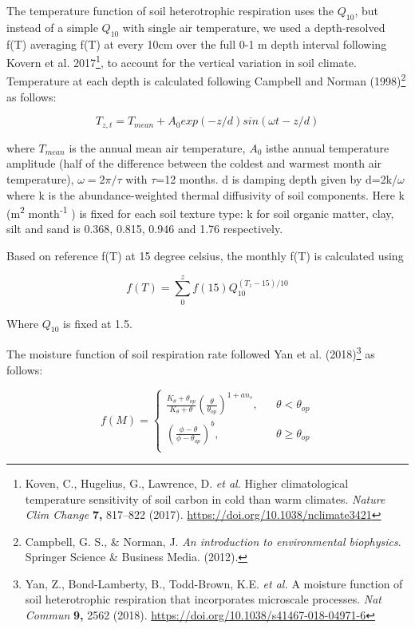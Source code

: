 \documentclass[
]{article}
\begin{document}
The temperature function of soil heterotrophic respiration uses the
\(Q_{10}\), but instead of a simple \(Q_{10}\) with single air
temperature, we used a depth-resolved f(T) averaging f(T) at every 10cm
over the full 0-1 m depth interval following Kovern et al.
2017\footnote{Koven, C., Hugelius, G., Lawrence, D. \emph{et al.} Higher
  climatological temperature sensitivity of soil carbon in cold than
  warm climates. \emph{Nature Clim Change} \textbf{7,} 817--822 (2017).
  \url{https://doi.org/10.1038/nclimate3421}}, to account for the
vertical variation in soil climate. Temperature at each depth is
calculated following Campbell and Norman (1998)\footnote{Campbell, G.
  S., \& Norman, J. \emph{An introduction to environmental biophysics}.
  Springer Science \& Business Media. (2012).} as follows:

\[T_{z,t} = T_{mean}+A_0exp(-z/d)sin(\omega t-z/d)\]

where \(T_{mean}\) is the annual mean air temperature, \(A_0\) isthe
annual temperature amplitude (half of the difference between the coldest
and warmest month air temperature), \(\omega=2 \pi / \tau\) with
\(\tau\)=12 months. d is damping depth given by d=2k/\(\omega\) where k
is the abundance-weighted thermal diffusivity of soil components. Here k
(m\textsuperscript{2} month\textsuperscript{-1} ) is fixed for each soil
texture type: k for soil organic matter, clay, silt and sand is 0.368,
0.815, 0.946 and 1.76 respectively.

Based on reference f(T) at 15 degree celsius, the monthly f(T) is
calculated using

\[f(T) = \sum_0^{z}f(15)Q_{10}^{(T_{z}-15)/10}\]

Where \(Q_{10}\) is fixed at 1.5.

The moisture function of soil respiration rate followed Yan et al.
(2018)\footnote{Yan, Z., Bond-Lamberty, B., Todd-Brown, K.E. \emph{et
  al.} A moisture function of soil heterotrophic respiration that
  incorporates microscale processes. \emph{Nat Commun} \textbf{9,} 2562
  (2018). \url{https://doi.org/10.1038/s41467-018-04971-6}} as follows:

\[f(M) = \left\{
\begin{array}{lcl}
\frac{K_\theta+\theta_{op}}{K_\theta+\theta}(\frac{\theta}{\theta_{op}})^{1+an_s},  &   & {\theta<\theta_{op}}\\
(\frac{\phi-\theta}{\phi-\theta_{op}})^b,     &      & {\theta \geq \theta_{op}}\\
\end{array} \right.\]
\end{document}
